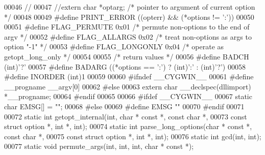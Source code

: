 \begin{DoxyCode}
00046 \textcolor{comment}{//}
00047 \textcolor{comment}{//extern char *optarg;      /* pointer to argument of current option  */}
00048 
00049 \textcolor{preprocessor}{#define PRINT\_ERROR ((opterr) && (*options != ':'))}
00050 
00051 \textcolor{preprocessor}{#define FLAG\_PERMUTE    0x01    }\textcolor{comment}{/* permute non-options to the end of argv */}\textcolor{preprocessor}{}
00052 \textcolor{preprocessor}{#define FLAG\_ALLARGS    0x02    }\textcolor{comment}{/* treat non-options as args to option "-1" */}\textcolor{preprocessor}{}
00053 \textcolor{preprocessor}{#define FLAG\_LONGONLY   0x04    }\textcolor{comment}{/* operate as getopt\_long\_only */}\textcolor{preprocessor}{}
00054 
00055 \textcolor{comment}{/* return values */}
00056 \textcolor{preprocessor}{#define BADCH       (int)'?'}
00057 \textcolor{preprocessor}{#define BADARG      ((*options == ':') ? (int)':' : (int)'?')}
00058 \textcolor{preprocessor}{#define INORDER     (int)1}
00059 
00060 \textcolor{preprocessor}{#ifndef \_\_CYGWIN\_\_}
00061 \textcolor{preprocessor}{#define \_\_progname \_\_argv[0]}
00062 \textcolor{preprocessor}{#else}
00063 \textcolor{keyword}{extern} \textcolor{keywordtype}{char} __declspec(dllimport) *__progname;
00064 \textcolor{preprocessor}{#endif}
00065 
00066 \textcolor{preprocessor}{#ifdef \_\_CYGWIN\_\_}
00067 \textcolor{keyword}{static} \textcolor{keywordtype}{char} EMSG[] = \textcolor{stringliteral}{""};
00068 \textcolor{preprocessor}{#else}
00069 \textcolor{preprocessor}{#define EMSG        ""}
00070 \textcolor{preprocessor}{#endif}
00071 
00072 \textcolor{keyword}{static} \textcolor{keywordtype}{int} getopt_internal(\textcolor{keywordtype}{int}, \textcolor{keywordtype}{char} * \textcolor{keyword}{const} *, \textcolor{keyword}{const} \textcolor{keywordtype}{char} *,
00073                \textcolor{keyword}{const} \textcolor{keyword}{struct} option *, \textcolor{keywordtype}{int} *, \textcolor{keywordtype}{int});
00074 \textcolor{keyword}{static} \textcolor{keywordtype}{int} parse_long_options(\textcolor{keywordtype}{char} * \textcolor{keyword}{const} *, \textcolor{keyword}{const} \textcolor{keywordtype}{char} *,
00075                   \textcolor{keyword}{const} \textcolor{keyword}{struct} option *, \textcolor{keywordtype}{int} *, \textcolor{keywordtype}{int});
00076 \textcolor{keyword}{static} \textcolor{keywordtype}{int} gcd(\textcolor{keywordtype}{int}, \textcolor{keywordtype}{int});
00077 \textcolor{keyword}{static} \textcolor{keywordtype}{void} permute_args(\textcolor{keywordtype}{int}, \textcolor{keywordtype}{int}, \textcolor{keywordtype}{int}, \textcolor{keywordtype}{char} * \textcolor{keyword}{const} *);

\end{DoxyCode}

